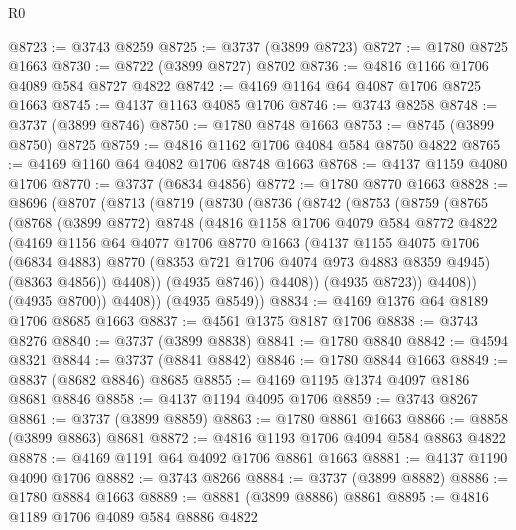 \begin{lexlean}{R0}
\begin{coremodule}
@8723 := @3743 @8259
@8725 := @3737 (@3899 @8723)
@8727 := @1780 @8725 @1663
@8730 := @8722 (@3899 @8727) @8702
@8736 := @4816 @1166 @1706 @4089 @584 @8727 @4822
@8742 := @4169 @1164 @64 @4087 @1706 @8725 @1663
@8745 := @4137 @1163 @4085 @1706
@8746 := @3743 @8258
@8748 := @3737 (@3899 @8746)
@8750 := @1780 @8748 @1663
@8753 := @8745 (@3899 @8750) @8725
@8759 := @4816 @1162 @1706 @4084 @584 @8750 @4822
@8765 := @4169 @1160 @64 @4082 @1706 @8748 @1663
@8768 := @4137 @1159 @4080 @1706
@8770 := @3737 (@6834 @4856)
@8772 := @1780 @8770 @1663
@8828 := @8696
    (@8707
      (@8713
        (@8719
          (@8730
            (@8736
              (@8742
                (@8753
                  (@8759
                    (@8765
                      (@8768
                        (@3899 @8772)
                        @8748
                        (@4816
                          @1158
                          @1706
                          @4079
                          @584
                          @8772
                          @4822
                          (@4169
                            @1156
                            @64
                            @4077
                            @1706
                            @8770
                            @1663
                            (@4137
                              @1155
                              @4075
                              @1706
                              (@6834 @4883)
                              @8770
                              (@8353 @721 @1706 @4074 @973 @4883 @8359 @4945)
                              (@8363 @4856))
                            @4408))
                        (@4935 @8746))
                      @4408))
                  (@4935 @8723))
                @4408))
            (@4935 @8700))
          @4408))
      (@4935 @8549))
@8834 := @4169 @1376 @64 @8189 @1706 @8685 @1663
@8837 := @4561 @1375 @8187 @1706
@8838 := @3743 @8276
@8840 := @3737 (@3899 @8838)
@8841 := @1780 @8840
@8842 := @4594 @8321
@8844 := @3737 (@8841 @8842)
@8846 := @1780 @8844 @1663
@8849 := @8837 (@8682 @8846) @8685
@8855 := @4169 @1195 @1374 @4097 @8186 @8681 @8846
@8858 := @4137 @1194 @4095 @1706
@8859 := @3743 @8267
@8861 := @3737 (@3899 @8859)
@8863 := @1780 @8861 @1663
@8866 := @8858 (@3899 @8863) @8681
@8872 := @4816 @1193 @1706 @4094 @584 @8863 @4822
@8878 := @4169 @1191 @64 @4092 @1706 @8861 @1663
@8881 := @4137 @1190 @4090 @1706
@8882 := @3743 @8266
@8884 := @3737 (@3899 @8882)
@8886 := @1780 @8884 @1663
@8889 := @8881 (@3899 @8886) @8861
@8895 := @4816 @1189 @1706 @4089 @584 @8886 @4822

\end{coremodule}
\end{lexlean}
